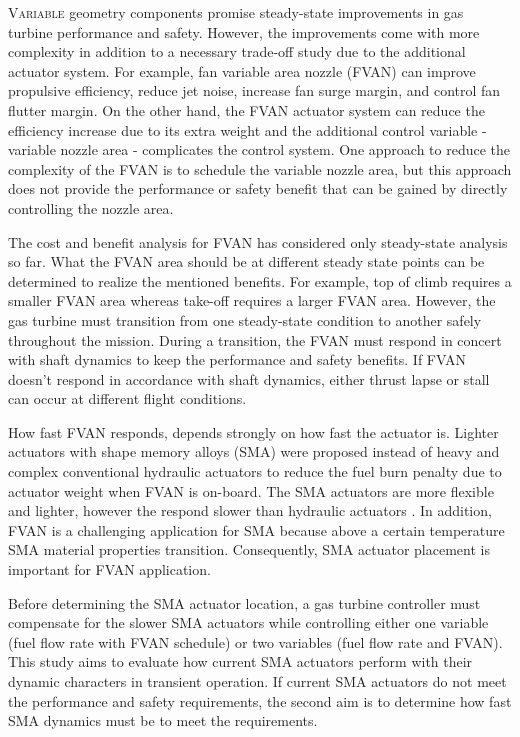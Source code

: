 \lettrine[nindent=0pt]{V}{ariable} geometry components promise steady-state improvements in gas turbine performance and safety. However, the improvements come with more complexity in addition to a necessary trade-off study due to the additional actuator system. %
For example, fan variable area nozzle (FVAN) can improve propulsive efficiency, reduce jet noise, increase fan surge margin, and control fan flutter margin. On the other hand, the FVAN actuator system can reduce the efficiency increase due to its extra weight and the additional control variable - variable nozzle area - complicates the control system.  One approach to reduce the complexity of the FVAN is to schedule the variable nozzle area, but this approach does not provide the performance or safety benefit that can be gained by directly controlling the nozzle area. 

The cost and benefit analysis for FVAN has considered only steady-state analysis so far. What the FVAN area should be at different steady state points can be determined to realize the mentioned benefits. For example, top of climb requires a smaller FVAN area whereas take-off requires a larger FVAN area. However, the gas turbine must transition from one steady-state condition to another safely throughout the mission. During a transition, the FVAN must respond in concert with shaft dynamics to keep the performance and safety benefits.%
 If FVAN doesn't respond in accordance with shaft dynamics, either thrust lapse or stall can occur at different flight conditions. 

How fast FVAN responds, depends strongly on how fast the actuator is. Lighter actuators with shape memory alloys (SMA) \cite{Mabe:2008,Mabe:2008:Paris} were proposed instead of heavy and complex conventional hydraulic actuators to reduce the fuel burn penalty due to actuator weight when FVAN is on-board. The SMA actuators are more flexible and lighter, however the respond slower than hydraulic actuators \cite{Rey:2001,Barooah:2002,Song:2007}. In addition, FVAN is a challenging application for SMA because above a certain temperature SMA material properties transition. Consequently, SMA actuator placement is important for FVAN application.  

Before determining the SMA actuator location, a gas turbine controller must compensate for the slower SMA actuators while controlling either one variable (fuel flow rate with FVAN schedule) or two variables (fuel flow rate and FVAN). This study aims to evaluate how current SMA actuators perform with their dynamic characters in transient operation. If current SMA actuators do not meet the performance and safety requirements, the second aim is to determine how fast SMA dynamics must be to meet the requirements.

